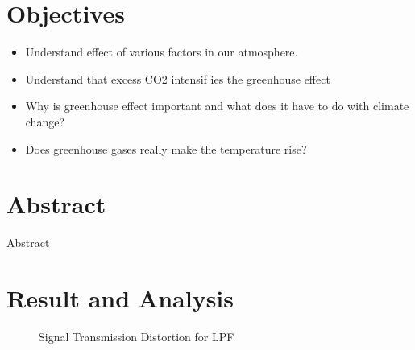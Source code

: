 \documentclass[a4paper, 12pt, english]{article}
\begin{document}


\newpage
\section{Objectives}
\begin{itemize}
	\item Understand effect of various factors in our atmosphere.
	\item Understand that excess CO2 intensif ies the greenhouse effect
	\item Why is greenhouse effect important and what does it have to do with climate
	      change?
	\item Does greenhouse gases really make the temperature rise?
\end{itemize}
\section{Abstract}
Abstract

\section{Result and Analysis}
\begin{figure}[!ht]
	\centering
	\qquad
	\qquad
	\caption{Signal Transmission Distortion for LPF}
	\label{fig:STDLPF}
\end{figure}
\end{document}
